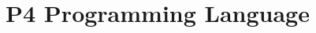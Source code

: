 \documentclass[a4paper]{scrartcl}
\title{P4 Programming Language}
\begin{document}
\small

\maketitle


\end{document}
